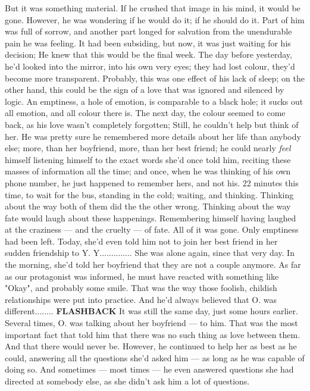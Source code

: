 But it was something material. 
If he crushed that image in his mind, it would be gone. 
However, he was wondering if he would do it; if he should do it. 
Part of him was full of sorrow, and another part longed for salvation from the unendurable pain he was feeling. 
It had been subsiding, but now, it was just waiting for his decision; He knew that this would be the final week. 
The day before yesterday, he'd looked into the mirror, into his own very eyes; they had lost colour, they'd become more transparent. 
Probably, this was one effect of his lack of sleep; on the other hand, this could be the sign of a love that was ignored and silenced by logic. 
An emptiness, a hole of emotion, is comparable to a black hole; it sucks out all emotion, and all colour there is. 
The next day, the colour seemed to come back, as his love wasn't completely forgotten; Still, he couldn't help but think of her. 
He was pretty sure he remembered more details about her life than anybody else; more, than her boyfriend, more, than her best friend; he could nearly \emph{feel} himself listening himself to the exact words she'd once told him, reciting these masses of information all the time; and once, when he was thinking of his own phone number, he just happened to remember hers, and not his. 
22 minutes this time, to wait for the bus, standing in the cold; waiting, and thinking. 
Thinking about the way both of them did the the other wrong. 
Thinking about the way fate would laugh about these happenings. 
Remembering himself having laughed at the craziness --- and the cruelty --- of fate. 
All of it was gone. 
Only emptiness had been left. 
Today, she'd even told him not to join her best friend in her sudden friendship to Y. 
Y..............
She was alone again, since that very day. 
In the morning, she'd told her boyfriend that they are not a couple anymore. 
As far as our protagonist was informed, he must have reacted with something like "Okay", and probably some smile. 
That was the way those foolish, childish relationships were put into practice. 
And he'd always believed that O. was different........
\textbf{FLASHBACK}
It was still the same day, just some hours earlier. 
Several times, O. was talking about her boyfriend --- to him. 
That was the most important fact that told him that there was no such thing as love between them. 
And that there would never be. 
However, he continued to help her as best as he could, answering all the questions she'd asked him --- as long as he was capable of doing so. 
And sometimes --- most times --- he even answered questions she had directed at somebody else, as she didn't ask him a lot of questions. 
